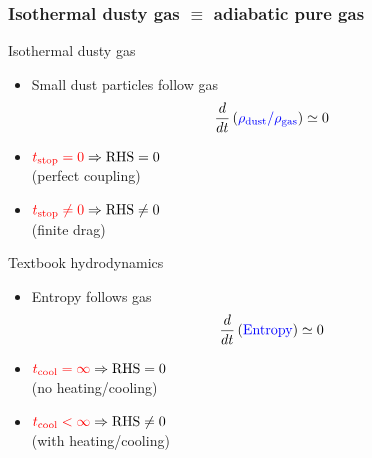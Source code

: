 \documentclass[10pt]{beamer}
\begin{document}
\begin{frame}
  \frametitle{Isothermal dusty gas $\equiv$ adiabatic pure gas}
  \begin{minipage}{.99\linewidth}
 \begin{minipage}[t]{0.49\linewidth}
    \centering \begin{onlinebox}{4cm}Isothermal dusty gas\end{onlinebox}
    \begin{itemize}
    \item Small dust particles follow gas 
      \[
      \frac{d}{d
        t}\left(\textcolor{blue}{\rho_\text{dust}/\rho_\text{gas}}\right)
      \simeq 0 
      \]
      \vspace{0.5cm}
    \item $\textcolor{red}{t_\text{stop}=0} \Rightarrow \text{RHS}=0$\\
      (perfect coupling)
 \vspace{0.5cm}
      \item  $\textcolor{red}{t_\text{stop}\neq0} \Rightarrow \text{RHS}\neq0$\\
        (finite drag)
    \end{itemize}
  \end{minipage}
  \begin{minipage}[t]{0.49\linewidth}
    \centering \begin{onlinebox}{4cm}Textbook hydrodynamics\end{onlinebox}
    \begin{itemize}
    \item Entropy follows gas
      \[
      \frac{d}{d
        t}\left(\textcolor{blue}{\text{Entropy}}\right)
      \simeq 0 
      \]
 \vspace{0.5cm}
    \item $\textcolor{red}{t_\text{cool} = \infty} \Rightarrow \text{RHS} = 0$ \\
      (no heating/cooling) 
 \vspace{0.5cm}
    \item $\textcolor{red}{t_\text{cool} < \infty} \Rightarrow \text{RHS} \neq 0$
      \\
      (with heating/cooling) 
    \end{itemize}
  \end{minipage}
\end{minipage}
\end{frame}
\end{document}
